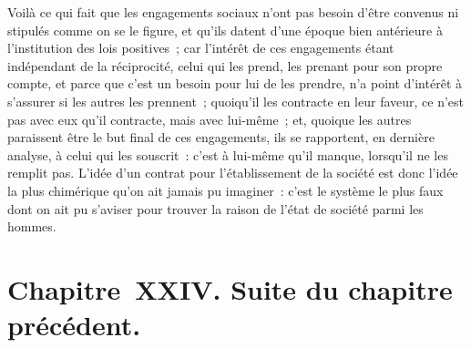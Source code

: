 \documentclass[french,twoside]{book} %
\newcommand\chapteropen{} %
\newcommand\chapterclose{} %
\begin{document}
Voilà ce qui fait que les engagements sociaux n’ont pas besoin d’être convenus ni stipulés comme on se le figure, et qu’ils datent d’une époque bien antérieure à l’institution des lois positives ; car l’intérêt de ces engagements étant indépendant de la réciprocité, celui qui les prend, les prenant pour son propre compte, et parce que c’est un besoin pour lui de les prendre, n’a point d’intérêt à s’assurer si les autres les prennent ; quoiqu’il les contracte en leur faveur, ce n’est pas avec eux qu’il contracte, mais avec lui-même ; et, quoique les autres paraissent être le but final de ces engagements, ils se rapportent, en dernière analyse, à celui qui les souscrit : c’est à lui-même qu’il manque, lorsqu’il ne les remplit pas. L’idée d’un contrat pour l’établissement de la société est donc l’idée la plus chimérique qu’on ait jamais pu imaginer : c’est le système le plus faux dont on ait pu s’aviser pour trouver la raison de l’état de société parmi les hommes.
\chapterclose


\chapteropen
\chapter[{Chapitre XXIV. Suite du chapitre précédent.}]{Chapitre XXIV. Suite du chapitre précédent.}\renewcommand{\leftmark}{Chapitre XXIV. Suite du chapitre précédent.}
\end{document}
